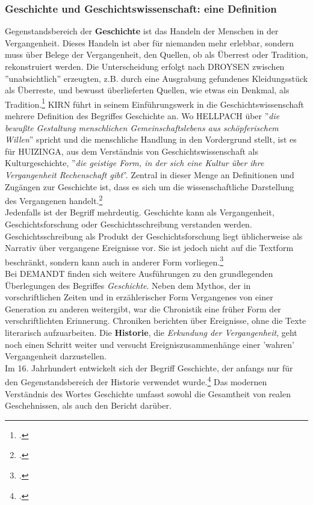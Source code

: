 \documentclass[12pt,a4paper]{article}
\begin{document}
\subsubsection{Geschichte und Geschichtswissenschaft: eine Definition}
Gegenstandsbereich der \textbf{Geschichte} ist das Handeln der Menschen in der Vergangenheit. Dieses Handeln ist aber für niemanden mehr erlebbar, sondern muss über Belege der Vergangenheit, den Quellen, ob als Überrest oder Tradition, rekonstruiert werden. Die Unterscheidung erfolgt nach DROYSEN zwischen ''unabsichtlich'' erzeugten, z.B. durch eine Ausgrabung gefundenes Kleidungsstück als Überreste, und bewusst überlieferten Quellen, wie etwas ein Denkmal, als Tradition.\footcite[][49–55]{schulz2010neuere} KIRN führt in seinem Einführungswerk in die Geschichtswissenschaft mehrere Definition des Begriffes Geschichte an. Wo HELLPACH über ''\textit{die bewußte Gestaltung menschlichen Gemeinschaftslebens aus schöpferischem Willen}'' spricht und die menschliche Handlung in den Vordergrund stellt, ist es für HUIZINGA, aus dem Verständnis von Geschichtswissenschaft als Kulturgeschichte, ''\textit{die geistige Form, in der sich eine Kultur über ihre Vergangenheit Rechenschaft gibt}''. Zentral in dieser Menge an Definitionen und Zugängen zur Geschichte ist, dass es sich um die wissenschaftliche Darstellung des Vergangenen handelt.\footcite[][S.7-12]{KirnPaul2015EidG}
\\
Jedenfalls ist der Begriff mehrdeutig. Geschichte kann als Vergangenheit, Geschichtsforschung oder Geschichtsschreibung verstanden werden. Geschichtsschreibung als Produkt der Geschichtsforschung liegt üblicherweise als Narrativ über vergangene Ereignisse vor. Sie ist jedoch nicht auf die Textform beschränkt, sondern kann auch in anderer Form vorliegen.\footcite[][S.5-7]{frank2018visualisierungswerkzeuge}
\\
Bei DEMANDT finden sich weitere Ausführungen zu den grundlegenden Überlegungen des Begriffes \textit{Geschichte}. Neben dem Mythos, der in vorschriftlichen Zeiten und in erzählerischer Form Vergangenes von einer Generation zu anderen weitergibt, war die Chronistik eine früher Form der verschriftlichten Erinnerung. Chroniken berichten über Ereignisse, ohne die Texte literarisch aufzuarbeiten. Die \textbf{Historie}, die \textit{Erkundung der Vergangenheit}, geht noch einen Schritt weiter und versucht Ereigniszusammenhänge einer 'wahren' Vergangenheit darzustellen. 
\\
Im 16. Jahrhundert entwickelt sich der Begriff Geschichte, der anfangs nur für den Gegenstandsbereich der Historie verwendet wurde.\footcite[][S.57-58]{schulz2010neuere} Das modernen Verständnis des Wortes Geschichte umfasst sowohl die Gesamtheit von realen Geschehnissen, als auch den Bericht darüber.
\end{document}
